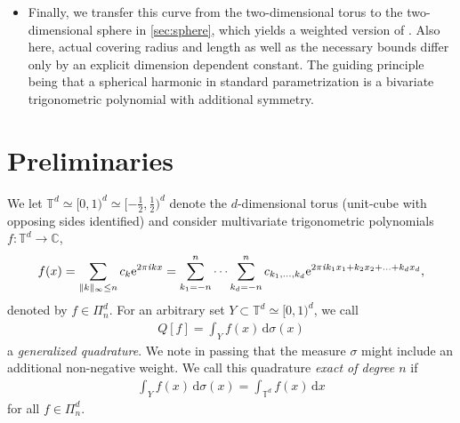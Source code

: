 \documentclass[11pt,a4paper,twoside,final,biblatex]{scrartcl}
\newcommand{\T}{\ensuremath{\mathbb{T}}}
\newcommand{\C}{\ensuremath{\mathbb{C}}}
\newcommand{\ii}{\mathit{i}}
\newcommand{\eip}[1]{\textnormal{e}^{2\pi\ii{#1}}}
\renewcommand{\d}{\,\mathrm{d}}
\theoremstyle{definition}
\numberwithin{equation}{section}
\numberwithin{table}{section}
\numberwithin{figure}{section}
\begin{document}
\begin{itemize}
    The very same construction for algebraic polynomials on the unit cube can be found in \cite{BoDeVi17}. We compute the exact covering radius and length of the curve in \cref{thm:gamma2}, which yields that the before proven necessary bounds are optimal up to a dimension dependent constant.
    \item Finally, we transfer this curve from the two-dimensional torus to the two-dimensional sphere in \cref{sec:sphere}, which yields a weighted version of \cite[Thm.~1.2]{EhGr23}. Also here, actual covering radius and length as well as the necessary bounds differ only by an explicit dimension dependent constant. The guiding principle being that a spherical harmonic in standard parametrization is a bivariate trigonometric polynomial with additional symmetry.
\end{itemize}

\section{Preliminaries}

We let $\T^d\simeq [0,1)^d\simeq [-\frac12,\frac12)^d$ denote the $d$-dimensional torus (unit-cube with opposing sides identified) and consider multivariate trigonometric polynomials $f\colon\T^d\to\C$,
\begin{align*}
    f(x)=\sum_{\|k\|_\infty\le n} c_k \eip{kx}
    =\sum_{k_1=-n}^n\dots\sum_{k_d=-n}^n c_{k_1,\hdots,k_d} \eip{k_1x_1+k_2x_2+\hdots+k_dx_d},
\end{align*}
denoted by $f\in \Pi_n^d$.
For an arbitrary set $Y\subset\T^d\simeq[0,1)^d$, we call
\begin{align*}
  Q[f]=\int_Y f(x)\d \sigma(x)  
\end{align*}
a \emph{generalized quadrature}. We note in passing that the measure $\sigma$ might include an additional non-negative weight. We call this quadrature \emph{exact of degree $n$} if
\begin{align*}
   \int_Y f(x)\d \sigma(x) = \int_{\T^d} f(x)\d x
\end{align*}
for all $f\in \Pi_n^d$.
\end{document}
